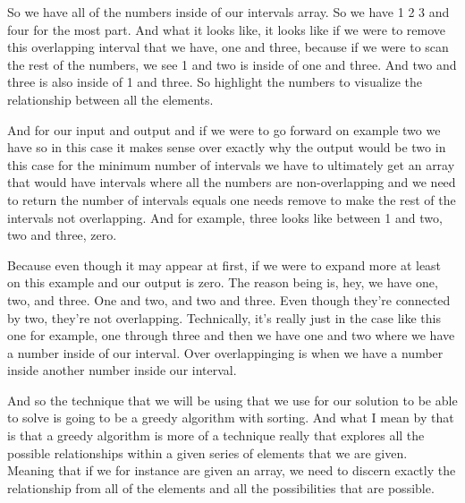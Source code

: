 \expandafter\def\csname sourceexcerpt@38\endcsname{%
So we have all of the numbers inside of our intervals array. So we have 1 2 3 and four
for the most part. And what it looks like, it looks like if we were to remove this
overlapping interval that we have, one and three, because if we were to scan the rest
of the numbers, we see 1 and two is inside of one and three. And two and three is also
inside of 1 and three. So highlight the numbers to visualize the relationship between
all the elements.

And for our input and output and if we were to go forward on example two we have so in
this case it makes sense over exactly why the output would be two in this case for the
minimum number of intervals we have to ultimately get an array that would have
intervals where all the numbers are non-overlapping and we need to return the
number of intervals equals one needs remove to make the rest of the intervals not
overlapping. And for example, three looks like between 1 and two, two and three, zero.

Because even though it may appear at first, if we were to expand more at least on this
example and our output is zero. The reason being is, hey, we have one, two, and three.
One and two, and two and three. Even though they're connected by two, they're not
overlapping. Technically, it's really just in the case like this one for example, one
through three and then we have one and two where we have a number inside of our
interval. Over overlappinging is when we have a number inside another number inside
our interval.

And so the technique that we will be using that we use for
our solution to be able to solve is going to be a greedy algorithm with sorting. And
what I mean by that is that a greedy algorithm is more of a technique really that
explores all the possible relationships within a given series of elements that we are
given. Meaning that if we for instance are given an array, we need to discern exactly
the relationship from all of the elements and all the possibilities that are possible.
}

